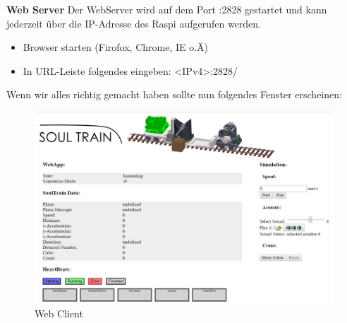 \documentclass[../../main.tex]{subfiles}
\begin{document}
\textbf{Web Server}
Der WebServer wird auf dem Port :2828 gestartet und kann jederzeit über die IP-Adresse des Raspi aufgerufen werden.
\begin{itemize}
    \item Browser starten (Firofox, Chrome, IE o.Ä)
    \item In URL-Leiste folgendes eingeben: <IPv4>:2828/
\end{itemize}

Wenn wir alles richtig gemacht haben sollte nun folgendes Fenster erscheinen:
\begin{figure}[H] \centering
    \includegraphics[width=1\textwidth]{HomeWebApp}
    \caption{Web Client}
    \label{fig:Home}
\end{figure}
\end{document}
